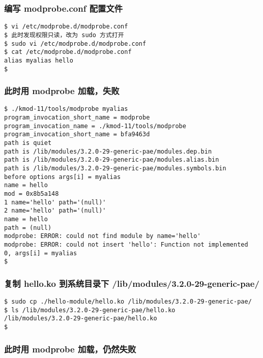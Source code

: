 \documentclass[11pt,a4paper]{article}
\begin{document}
\subsubsection{编写 modprobe.conf 配置文件}

{\begin{shaded}\begin{verbatim}
$ vi /etc/modprobe.d/modprobe.conf 
$ 此时发现权限只读，改为 sudo 方式打开
$ sudo vi /etc/modprobe.d/modprobe.conf 
$ cat /etc/modprobe.d/modprobe.conf 
alias myalias hello
$ 
\end{verbatim}\end{shaded}}
\subsubsection{此时用 modprobe 加载，失败}

{\begin{shaded}\begin{verbatim}
$ ./kmod-11/tools/modprobe myalias
program_invocation_short_name = modprobe
program_invocation_name = ./kmod-11/tools/modprobe
program_invocation_short_name = bfa9463d
path is quiet
path is /lib/modules/3.2.0-29-generic-pae/modules.dep.bin
path is /lib/modules/3.2.0-29-generic-pae/modules.alias.bin
path is /lib/modules/3.2.0-29-generic-pae/modules.symbols.bin
before options args[i] = myalias
name = hello
mod = 0x8b5a148
1 name='hello' path='(null)'
2 name='hello' path='(null)'
name = hello
path = (null)
modprobe: ERROR: could not find module by name='hello'
modprobe: ERROR: could not insert 'hello': Function not implemented
0, args[i] = myalias
$ 
\end{verbatim}\end{shaded}}
\subsubsection{复制 hello.ko 到系统目录下
/lib/modules/3.2.0-29-generic-pae/}

{\begin{shaded}\begin{verbatim}
$ sudo cp ./hello-module/hello.ko /lib/modules/3.2.0-29-generic-pae/
$ ls /lib/modules/3.2.0-29-generic-pae/hello.ko 
/lib/modules/3.2.0-29-generic-pae/hello.ko
$ 
\end{verbatim}\end{shaded}}
\subsubsection{此时用 modprobe 加载，仍然失败}
\end{document}
